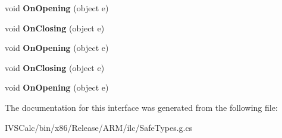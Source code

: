 \begin{DoxyCompactItemize}
void {\bfseries On\+Opening} (object e)
\item 
\mbox{\label{interface_windows_1_1_u_i_1_1_xaml_1_1_controls_1_1_i_app_bar_overrides3_a74ddaa1e19579219f9d3bceb70019653}} 
void {\bfseries On\+Closing} (object e)
\item 
\mbox{\label{interface_windows_1_1_u_i_1_1_xaml_1_1_controls_1_1_i_app_bar_overrides3_ab04fbf60e05e35f50544a19f79167d6c}} 
void {\bfseries On\+Opening} (object e)
\item 
\mbox{\label{interface_windows_1_1_u_i_1_1_xaml_1_1_controls_1_1_i_app_bar_overrides3_a74ddaa1e19579219f9d3bceb70019653}} 
void {\bfseries On\+Closing} (object e)
\item 
\mbox{\label{interface_windows_1_1_u_i_1_1_xaml_1_1_controls_1_1_i_app_bar_overrides3_ab04fbf60e05e35f50544a19f79167d6c}} 
void {\bfseries On\+Opening} (object e)
\end{DoxyCompactItemize}


The documentation for this interface was generated from the following file\+:\begin{DoxyCompactItemize}
\item 
I\+V\+S\+Calc/bin/x86/\+Release/\+A\+R\+M/ilc/Safe\+Types.\+g.\+cs\end{DoxyCompactItemize}
